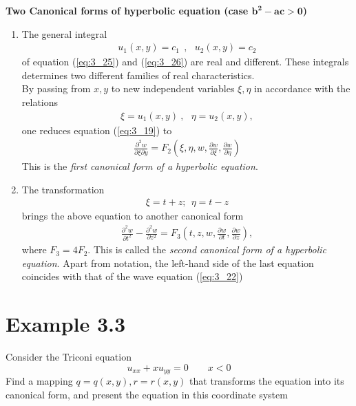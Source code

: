 \documentclass[11pt]{report}
\newcommand{\NI}{\noindent}
\newcommand{\refn}[1]{(\ref{#1})}
\newcommand{\refx}[1]{\refn{eq:#1}}
\newcommand{\bt}[1]{\textbf{#1}}
\begin{document}
	\NI\bt{Two Canonical forms of hyperbolic equation (case $\mathbf{b^2-ac>0}$)}
	\begin{enumerate}
		\item The general integral
		\begin{eqnarray*}
			u_1(x,y)=c_1 ~~, ~~~ u_2(x,y)=c_2
		\end{eqnarray*}
		of equation \refx{3_25} and \refx{3_26} are real and different. These integrals determines two different families of real characteristics.\\
		By passing from $x,y$ to new independent variables $\xi, \eta$ in accordance with the relations
		\begin{eqnarray*}
			\xi=u_1(x,y)~, ~~~ \eta = u_2(x,y),
		\end{eqnarray*}
		one reduces equation \refx{3_19} to
		\begin{eqnarray*}
			\frac{\partial^2 w}{\partial\xi\partial y} = F_2\left(\xi,\eta,w,\frac{\partial w}{\partial\xi},\frac{\partial w}{\partial\eta}\right)
		\end{eqnarray*}
		This is the \textit{first canonical form of a hyperbolic equation}.
		\item The transformation
		\begin{eqnarray*}
			\xi = t + z;~~ \eta = t-z
		\end{eqnarray*}
		brings the above equation to another canonical form
		\begin{eqnarray*}
			\frac{\partial^2 w}{\partial t^2} - \frac{\partial^2 w}{\partial z^2} = F_3\left(t,z,w,\frac{\partial w}{\partial t}, \frac{\partial w}{\partial z}\right),
		\end{eqnarray*}
		where $F_3=4F_2$. This is called the \textit{second canonical form of a hyperbolic equation}. Apart from notation, the left-hand side of the last equation coincides with that of the wave equation \refx{3_22}
	\end{enumerate}
	
	\section*{Example 3.3}
	Consider the Triconi equation
	\begin{equation}
		u_{xx} + xu_{yy} = 0 \qquad x < 0 \label{ex:3_3_1}\tag{1}
	\end{equation}
	Find a mapping $q=q(x,y), r=r(x,y)$ that transforms the equation into its canonical form, and present the equation in this coordinate system
	
\end{document}
